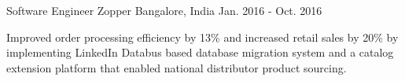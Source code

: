 \begin{cventries}
\cventry
    {Software Engineer} %
    {Zopper} %
    {Bangalore, India} %
    {Jan. 2016 - Oct. 2016} %
    {
      \begin{cvitems} %
        \item {Improved order processing efficiency by 13\% and increased retail sales by 20\% by implementing LinkedIn Databus based database migration system and a catalog extension platform that enabled national distributor product sourcing.}
      \end{cvitems}
    }
\end{cventries}
